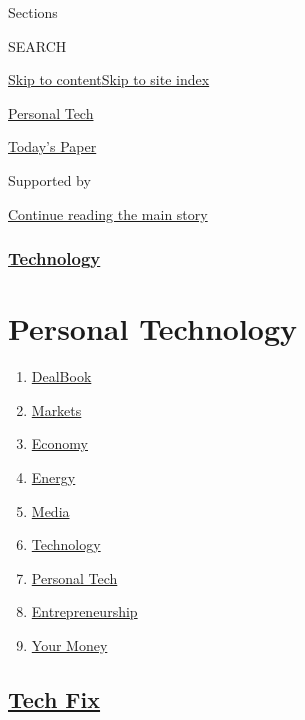 Sections

SEARCH

\protect\hyperlink{site-content}{Skip to
content}\protect\hyperlink{site-index}{Skip to site index}

\href{https://www.nytimes.com/section/technology/personaltech}{Personal
Tech}

\href{https://myaccount.nytimes.com/auth/login?response_type=cookie\&client_id=vi}{}

\href{https://www.nytimes.com/section/todayspaper}{Today's Paper}

Supported by

\protect\hyperlink{after-sponsor}{Continue reading the main story}

\hypertarget{technology}{%
\subsubsection{\texorpdfstring{\href{/section/technology}{Technology}}{Technology}}\label{technology}}

\hypertarget{personal-technology}{%
\section{Personal Technology}\label{personal-technology}}

\begin{enumerate}
\def\labelenumi{\arabic{enumi}.}
\tightlist
\item
  \href{/pages/business/dealbook/index.html}{DealBook}
\item
  \href{https://markets.on.nytimes.com}{Markets}
\item
  \href{/section/business/economy}{Economy}
\item
  \href{/section/business/energy-environment}{Energy}
\item
  \href{/section/business/media}{Media}
\item
  \href{/section/technology}{Technology}
\item
  \href{/section/technology/personaltech}{Personal Tech}
\item
  \href{/section/business/smallbusiness}{Entrepreneurship}
\item
  \href{/section/your-money}{Your Money}
\end{enumerate}

\hypertarget{tech-fix}{%
\subsection{\texorpdfstring{\href{/column/tech-fix}{Tech
Fix}}{Tech Fix}}\label{tech-fix}}


